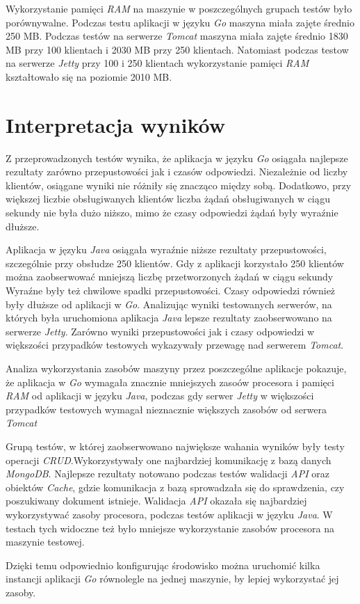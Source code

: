  Wykorzystanie pamięci \textsl{RAM} na maszynie  w poszczególnych grupach testów było porównywalne.  Podczas testu aplikacji w języku \textsl{Go} maszyna miała zajęte średnio 250 MB. Podczas testów na  serwerze \textsl{Tomcat} maszyna  miała zajęte średnio  1830 MB przy  100 klientach i 2030 MB przy 250 klientach. Natomiast podczas testow na serwerze \textsl{Jetty} przy 100 i 250 klientach wykorzystanie pamięci \textsl{RAM} kształtowało się na poziomie 2010 MB. 


\clearpage

\newpage
\section{Interpretacja wyników}

Z przeprowadzonych testów wynika, że aplikacja w języku \textsl{Go} osiągała najlepsze rezultaty zarówno przepustowości jak i czasów odpowiedzi. Niezależnie od liczby klientów, osiągane wyniki nie różniły się znacząco między sobą. Dodatkowo,  przy większej liczbie obsługiwanych klientów liczba żądań obsługiwanych w ciągu sekundy nie była dużo niższo, mimo że czasy odpowiedzi żądań były wyraźnie dłuższe.

Aplikacja w języku \textsl{Java} osiągała wyraźnie niższe rezultaty przepustowości,
szczególnie przy obsłudze 250 klientów. Gdy z aplikacji korzystało 250 klientów można zaobserwować  mniejszą liczbę przetworzonych żądań w ciągu sekundy Wyraźne były też chwilowe spadki przepustowości. Czasy odpowiedzi również były dłuższe od aplikacji w \textsl{Go}. Analizując wyniki testowanych serwerów, na których była uruchomiona aplikacja \textsl{Java} lepsze rezultaty zaobserwowano na serwerze \textsl{Jetty}. Zarówno wyniki przepustowości jak i  czasy odpowiedzi w większości przypadków testowych wykazywały przewagę nad serwerem \textsl{Tomcat}. 

Analiza wykorzystania zasobów maszyny przez poszczególne aplikacje pokazuje, że aplikacja w \textsl{Go} wymagała znacznie mniejszych zasoów procesora i pamięci \textsl{RAM} od aplikacji w języku \textsl{Java}, podczas gdy serwer \textsl{Jetty} w większości przypadków testowych wymagał nieznacznie większych zasobów  od serwera \textsl{Tomcat}

Grupą testów, w której zaobserwowano największe  wahania wyników były testy operacji \textsl{CRUD}.Wykorzystywały one  najbardziej  komunikację z bazą danych \textsl{MongoDB}. Najlepsze rezultaty notowano podczas testów walidacji \textsl{API} oraz obiektów \textsl{Cache}, gdzie komunikacja z bazą sprowadzała się do sprawdzenia, czy poszukiwany dokument istnieje. Walidacja \textsl{API} okazała się najbardziej wykorzystywać zasoby procesora, podczas testów aplikacji w języku \textsl{Java}. W testach tych widoczne też było mniejsze wykorzystanie zasobów procesora na maszynie testowej.

Dzięki temu odpowiednio konfigurując środowisko można uruchomić kilka instancji aplikacji \textsl{Go} równolegle na jednej maszynie, by lepiej wykorzystać jej zasoby.